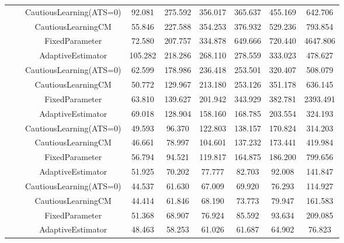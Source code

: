 \begin{table}[!h]
\begin{tabular}[t]{ccccccccc}
 &  & CautiousLearning(ATS=0) & 92.081 & 275.592 & 356.017 & 365.637 & 455.169 & 642.706\\

 &  & CautiousLearningCM & 55.846 & 227.588 & 354.253 & 376.932 & 529.236 & 793.854\\

 & \multirow[t]{-4}{*}{\centering\arraybackslash 0.25} & FixedParameter & 72.580 & 207.757 & 334.878 & 649.666 & 720.440 & 4647.806\\
\cmidrule{2-9}
 &  & AdaptiveEstimator & 105.282 & 218.286 & 268.110 & 278.559 & 333.023 & 478.627\\

 &  & CautiousLearning(ATS=0) & 62.599 & 178.986 & 236.418 & 253.501 & 320.407 & 508.079\\

 &  & CautiousLearningCM & 50.772 & 129.967 & 213.180 & 253.126 & 351.178 & 636.145\\

 & \multirow[t]{-4}{*}{\centering\arraybackslash 0.35} & FixedParameter & 63.810 & 139.627 & 201.942 & 343.929 & 382.781 & 2393.491\\
\cmidrule{2-9}
 &  & AdaptiveEstimator & 69.018 & 128.904 & 158.160 & 168.785 & 203.554 & 324.193\\

 &  & CautiousLearning(ATS=0) & 49.593 & 96.370 & 122.803 & 138.157 & 170.824 & 314.203\\

 &  & CautiousLearningCM & 46.661 & 78.997 & 104.601 & 137.232 & 173.441 & 419.984\\

 & \multirow[t]{-4}{*}{\centering\arraybackslash 0.50} & FixedParameter & 56.794 & 94.521 & 119.817 & 164.875 & 186.200 & 799.656\\
\cmidrule{2-9}
 &  & AdaptiveEstimator & 51.925 & 70.202 & 77.777 & 82.703 & 92.008 & 141.847\\

 &  & CautiousLearning(ATS=0) & 44.537 & 61.630 & 67.009 & 69.920 & 76.293 & 114.927\\

 &  & CautiousLearningCM & 44.414 & 61.846 & 68.190 & 73.773 & 79.947 & 161.583\\

 & \multirow[t]{-4}{*}{\centering\arraybackslash 0.75} & FixedParameter & 51.368 & 68.907 & 76.924 & 85.592 & 93.634 & 209.085\\
\cmidrule{2-9}
 &  & AdaptiveEstimator & 48.463 & 58.253 & 61.026 & 61.687 & 64.902 & 76.823\\


\end{tabular}
\end{table}
